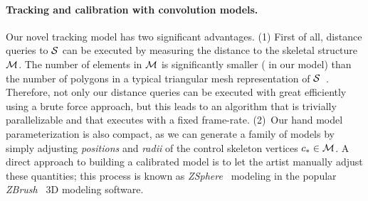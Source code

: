 \paragraph{Tracking and calibration with convolution models.}
Our novel tracking model has two significant advantages. (1) First of all, distance queries to $\mathcal{S}$ can be executed by measuring the distance to the skeletal structure $\mathcal{M}$. The number of elements in $\mathcal{M}$ is significantly smaller ( in our model) than the number of polygons in a typical triangular mesh representation of $\mathcal{S}$~\cite{thiery2013sphere}. Therefore, not only our distance queries can be executed with great efficiently using a brute force approach, but this leads to an algorithm that is trivially parallelizable and that executes with a fixed frame-rate. (2)~Our hand model parameterization is also compact, as we can generate a family of models by simply adjusting \emph{positions} and \emph{radii} of the control skeleton vertices $c_* \in \mathcal{M}$. A direct approach to building a calibrated model is to let the artist manually adjust these quantities; this process is known as  \emph{ZSphere~{\textcopyright}} modeling in the popular \emph{ZBrush~\textcopyright} 3D modeling software.  


